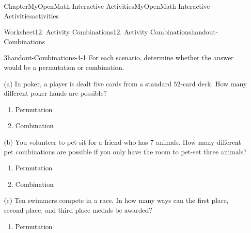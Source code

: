 \documentclass[oneside,10pt,]{book}
\newcommand{\blocktitlefont}{\relax}
\newcommand{\ptxlistdisc}{\raisebox{0.3ex}{\textbullet}}
\newlength{\fillinmaxwidth}
\newlength{\fillincontract}
\newlength{\charmaxwidth}\setlength{\charmaxwidth}{0.5em}
\newlength{\charminwidth}\setlength{\charminwidth}{0.1em}
\newlength{\fillinheight}
\newcommand{\fillintext}[1]{%
\setlength{\fillinmaxwidth}{#1\charmaxwidth}%
\setlength{\fillincontract}{#1\charminwidth}%
\setlength{\fillinheight}{\baselineskip}\addtolength{\fillinheight}{1.2pt}%
\strut\nobreak\leaders\vbox{\hrule width 0.3pt height 0.3pt \vskip -1.2pt}\hskip 1\fillinmaxwidth minus \fillincontract\nobreak\strut%
}
\begin{document}
\begin{chapterptx}{Chapter}{MyOpenMath Interactive Activities}{}{MyOpenMath Interactive Activities}{}{}{activities}
\begin{worksheet-section}{Worksheet}{12. Activity Combinations}{}{12. Activity Combinations}{}{}{handout-Combinations}
%
\clearpage
\begin{divisionexercise}{3}{}{}{handout-Combinations-4-1}%
For each scenario, determine whether the answer would be a permutation or combination.%
\par
(a)  In poker, a player is dealt five cards from a standard \(\displaystyle{52}\)-card deck. How many different poker hands are possible? \textasciigrave{}%
\par
%
\begin{enumerate}[label={(\alph*)}]
\item{}Permutation%
\item{}Combination%
\end{enumerate}
%
\par
(b)  You volunteer to pet-sit for a friend who has 7 animals. How many different pet combinations are possible if you only have the room to pet-set three animals?%
\par
%
\begin{enumerate}[label={(\alph*)}]
\item{}Permutation%
\item{}Combination%
\end{enumerate}
%
\par
(c)  Ten swimmers compete in a race. In how many ways can the first place, second place, and third place medals be awarded?%
\par
%
\begin{enumerate}[label={(\alph*)}]
\item{}Permutation%

\end{enumerate}
\end{divisionexercise}
\end{worksheet-section}
\end{chapterptx}
\end{document}

